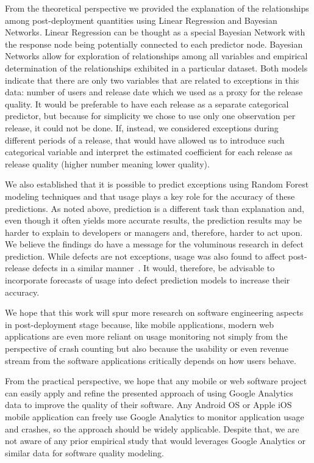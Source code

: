 \documentclass[smallextended]{svjour3}       %
\begin{document}
From the theoretical perspective we provided the explanation of the
relationships among post-deployment quantities using Linear
Regression and Bayesian Networks. Linear Regression can be thought
as a special Bayesian Network with the response node being
potentially connected to each predictor node. Bayesian Networks
allow for exploration of relationships among all variables and
empirical determination of the relationships exhibited in a
particular dataset.  Both models indicate that there are only two
variables that are related to exceptions in this data: number of
users and release date which we used as a proxy for the release
quality. It would be preferable to have each release as a separate
categorical predictor, but because for simplicity we chose to use
only one observation per release, it could not be done. If, instead,
we considered exceptions during different periods of a release, that
would have allowed us to introduce such categorical variable and
interpret the estimated coefficient for each release as release
quality (higher number meaning lower quality).

We also established
that it is possible to predict exceptions using Random Forest
modeling techniques and that usage plays a key role for the accuracy
of these predictions. As noted above, prediction is a different task
than explanation and, even though it often yields more accurate
results, the prediction results may be harder to explain to
developers or managers and, therefore, harder to act upon. We
believe the findings do have a message for the voluminous research
in defect prediction. While defects are not exceptions, usage was
also found to affect post-release defects in a similar
manner~\cite{caper,hmps15,mockus2005predictors}. It would, therefore, be advisable to 
incorporate forecasts of usage into defect prediction models  to increase their accuracy.

We hope that this work will spur more research on software engineering
aspects in post-deployment stage because, like mobile applications, 
modern web applications are even more reliant on usage monitoring not
simply from the perspective of crash counting but also because the
usability or even revenue stream from the software applications
critically depends on how users behave. 

From the practical perspective, we hope that any mobile or web
software project can easily apply and refine the presented approach
of using Google Analytics data to improve the quality of their
software.  Any Android OS or Apple iOS mobile application can freely use
Google Analytics to monitor application usage and crashes, so the
approach should be widely applicable. Despite that, we 
are not aware of any prior empirical study that would leverages Google
Analytics or similar data for software quality modeling.
\end{document}
